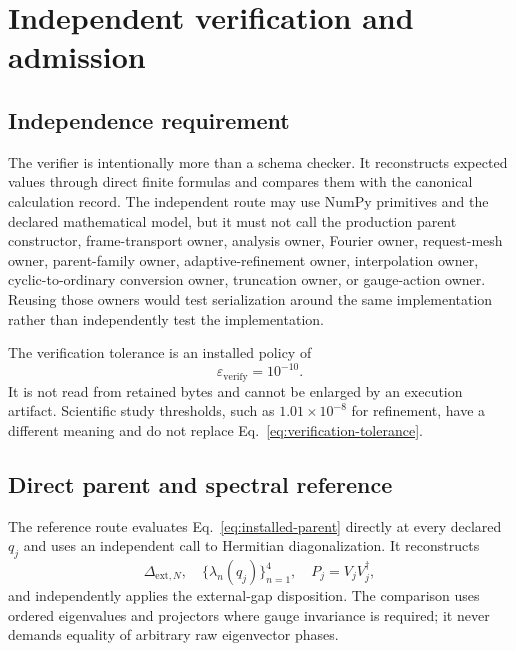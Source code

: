 \section{Independent verification and admission}

\subsection{Independence requirement}

The verifier is intentionally more than a schema checker.  It reconstructs expected
values through direct finite formulas and compares them with the canonical calculation
record.  The independent route may use NumPy primitives and the declared mathematical
model, but it must not call the production parent constructor, frame-transport owner,
analysis owner, Fourier owner, request-mesh owner, parent-family owner, adaptive-refinement
owner, interpolation owner, cyclic-to-ordinary conversion owner, truncation owner, or
gauge-action owner.  Reusing those owners would test serialization around the same
implementation rather than independently test the implementation.

The verification tolerance is an installed policy of
\begin{equation}
 \varepsilon_{\mathrm{verify}}=10^{-10}.
 \label{eq:verification-tolerance}
\end{equation}
It is not read from retained bytes and cannot be enlarged by an execution artifact.
Scientific study thresholds, such as $1.01\times10^{-8}$ for refinement, have a
different meaning and do not replace Eq.~\eqref{eq:verification-tolerance}.

\subsection{Direct parent and spectral reference}

The reference route evaluates Eq.~\eqref{eq:installed-parent} directly at every declared
$q_j$ and uses an independent call to Hermitian diagonalization.  It reconstructs
\begin{equation}
 \Delta_{\mathrm{ext},N},\quad
 \{\lambda_n(q_j)\}_{n=1}^4,
 \quad
 P_j=V_jV_j^\dagger,
 \label{eq:reference-parent-quantities}
\end{equation}
and independently applies the external-gap disposition.  The comparison uses ordered
eigenvalues and projectors where gauge invariance is required; it never demands equality
of arbitrary raw eigenvector phases.

